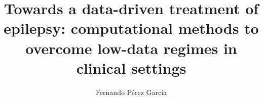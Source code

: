 \makeatletter

\title{
  Towards a data-driven treatment of epilepsy:
  computational methods to overcome low-data regimes in clinical settings
}\let\thetitle\@title

\author{Fernando Pérez García}\let\theauthor\@author

\makeatother
